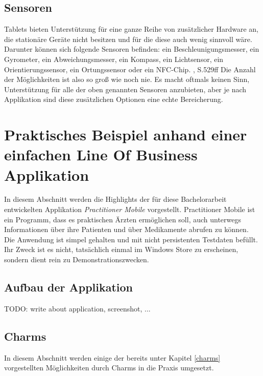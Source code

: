 \documentclass[a4paper,bibtotoc,oneside]{scrbook}
\begin{document}
\section[Sensoren]{Sensoren}
Tablets bieten Unterstützung für eine ganze Reihe von zusätzlicher Hardware an, die stationäre Geräte nicht besitzen und für die diese auch wenig sinnvoll wäre. Darunter können sich folgende Sensoren befinden: ein Beschleunigungsmesser, ein Gyrometer, ein Abweichungsmesser, ein Kompass, ein Lichtsensor, ein Orientierungssensor, ein Ortungssensor oder ein NFC-Chip. \cite{ana12}, S.529ff
\newline
Die Anzahl der Möglichkeiten ist also so groß wie noch nie. Es macht oftmals keinen Sinn, Unterstützung für alle der oben genannten Sensoren anzubieten, aber je nach Applikation sind diese zusätzlichen Optionen eine echte Bereicherung.


\chapter[Praktisches Beispiel anhand einer einfachen Line Of Business Applikation]{Praktisches Beispiel anhand einer einfachen Line Of Business Applikation}\label{practmobile}
In diesem Abschnitt werden die Highlights der für diese Bachelorarbeit entwickelten Applikation \textit{Practitioner Mobile} vorgestellt.
\newline
Practitioner Mobile ist ein Programm, dass es praktischen Ärzten ermöglichen soll, auch unterwegs Informationen über ihre Patienten und über Medikamente abrufen zu können. Die Anwendung ist simpel gehalten und mit nicht persistenten Testdaten befüllt. Ihr Zweck ist es nicht, tatsächlich einmal im Windows Store zu erscheinen, sondern dient rein zu Demonstrationszwecken.

\section[Aufbau der Applikation]{Aufbau der Applikation}
TODO: write about application, screenshot, ...

\section[Charms]{Charms}
In diesem Abschnitt werden einige der bereits unter Kapitel \ref{charms} vorgestellten Möglichkeiten durch Charms in die Praxis umgesetzt.
\end{document}
